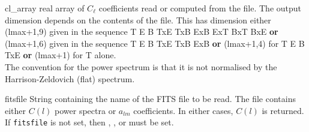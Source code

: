 \begin{qualifiers}
  \begin{qulist}{} %
    \item[cl\_array] %
      real array of $C_\ell$ coefficients read or computed from the
      file. The output dimension depends on the contents of the file. 
	This has dimension either (lmax+1,9) given in the sequence T E B
      TxE TxB ExB ExT BxT BxE {\bf or}
       (lmax+1,6) given in the sequence T E B
      TxE TxB ExB {\bf or} (lmax+1,4) for T E B TxE {\bf or} (lmax+1) for T
    alone. \\
     The convention for the power spectrum is that it is not
      normalised by the Harrison-Zeldovich (flat) spectrum.
%
    \item[fitsfile] %
    String containing the name of the FITS file to be read. The
    file contains either $C(l)$ power spectra or $a_{l m}$ coefficients. In either
    cases, $C(l)$ is returned. If {\tt fitsfile} is not set, then
,
,
 or
must be set.
  \end{qulist}
\end{qualifiers}

